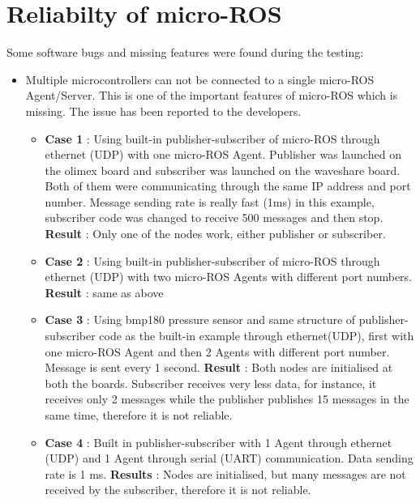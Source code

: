 \documentclass[%
xelatex,
	oneside,		%
	12pt,			%
	parskip=half,	%
	abstracton,
	chapterprefix=true%
    appendixprefix=true]
{scrbook}
\begin{document}
		\section{Reliabilty of micro-ROS}
		\vspace*{0.5cm}
		Some software bugs and missing features were found during the testing:
	\begin{itemize}	
	\item Multiple microcontrollers can not be connected to a single micro-ROS Agent/Server. This is one of the important features of micro-ROS which is missing. The issue has been reported to the developers.
\begin{itemize}
\item {\bfseries Case 1} : Using built-in publisher-subscriber of micro-ROS through ethernet (UDP) with one micro-ROS Agent. 
Publisher was launched on the olimex board and subscriber was launched on the waveshare board. Both of them were communicating through the same IP address and port number. Message sending rate is really fast (1ms) in this example, subscriber code was changed to receive 500 messages and then stop. \linebreak
{\bfseries Result} : Only one of the nodes work, either publisher or subscriber.

\item {\bfseries Case 2} : Using built-in publisher-subscriber of micro-ROS through ethernet (UDP) with two micro-ROS Agents with different port numbers.\linebreak
{\bfseries Result} : same as above

\item {\bfseries Case 3} : Using bmp180 pressure sensor and same structure of publisher-subscriber code as the built-in example through ethernet(UDP), first with one micro-ROS Agent and then 2 Agents with different port number.
Message is sent every 1 second.\linebreak
{\bfseries Result} : Both nodes are initialised at both the boards. Subscriber receives very less data, for instance, it receives only 2 messages while the publisher publishes 15 messages in the same time, therefore it is not reliable.

\item {\bfseries Case 4} : Built in publisher-subscriber with 1 Agent through ethernet (UDP) and 1 Agent through serial (UART) communication.
Data sending rate is 1 ms.\linebreak
{\bfseries Results} : Nodes are initialised, but many messages are not received by the subscriber, therefore it is not reliable.


\end{itemize}
\end{itemize}
\end{document}
